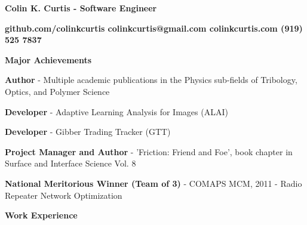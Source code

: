 \documentclass[letterpaper,final]{memoir}
\newcommand{\LargeSep}{\vspace{1.3em}}
\newcommand{\Sep}{\vspace{1.0em}}
\newcommand{\SmallSep}{\vspace{0.4em}}
\newcommand{\CVSection}[1]
	{\LARGE\textbf{#1}\par
	\SmallSep\normalsize}
\newcommand{\CVItem}[1]
	{\textbf{\color{Blue} #1}}
\newcommand\tab[1][1cm]{\hspace*{#1}}
\begin{document}
\Huge \bfseries {\color{Blue} Colin K. Curtis - Software Engineer}

\SmallSep
\normalsize\normalfont

\CVItem  \tab \bfseries {github.com/colinkcurtis \tab colinkcurtis@gmail.com  \tab colinkcurtis.com \tab  (919) 525 7837} 

\Sep





\notoserif \CVSection{Major Achievements}
\normalfont

\Sep

\begin{compactitem}
    
    \item \textbf{Author} - Multiple academic publications in the Physics sub-fields of Tribology, Optics, and Polymer Science
    \SmallSep

    \item \textbf{Developer} - Adaptive Learning Analysis for Images (ALAI) 
    \SmallSep
    
    \item \textbf{Developer} - Gibber Trading Tracker (GTT)
    \SmallSep

    \item \textbf{Project Manager and Author} - 'Friction: Friend and Foe', book chapter in Surface and Interface Science Vol. 8
    \SmallSep
    
    \item \textbf{National Meritorious Winner (Team of 3)} - COMAPS MCM, 2011 - Radio Repeater Network Optimization
	
\end{compactitem}

\LargeSep


\notoserif \CVSection{Work Experience}
\normalfont

\Sep
\end{document}
